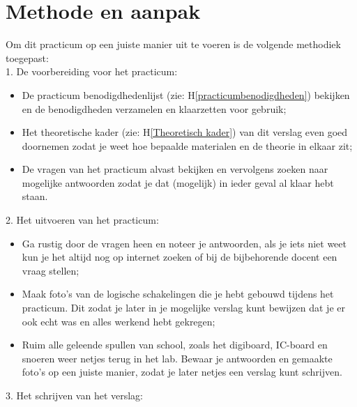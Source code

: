 \documentclass[12pt]{article}
\begin{document}
\section{Methode en aanpak}
Om dit practicum op een juiste manier uit te voeren is de volgende methodiek toegepast:\\
1. De voorbereiding voor het practicum:
\begin{itemize}
  \item De practicum benodigdhedenlijst (zie: H\ref{practicumbenodigdheden}) bekijken en de benodigdheden verzamelen en klaarzetten voor gebruik;
  \item Het theoretische kader (zie: H\ref{Theoretisch kader}) van dit verslag even goed doornemen zodat je weet hoe bepaalde materialen en de theorie in elkaar zit;
  \item De vragen van het practicum alvast bekijken en vervolgens zoeken naar mogelijke antwoorden zodat je dat (mogelijk) in ieder geval al klaar hebt staan. 
\end{itemize}
2. Het uitvoeren van het practicum:
\begin{itemize}
    \item Ga rustig door de vragen heen en noteer je antwoorden, als je iets niet weet kun je het altijd nog op internet zoeken of bij de bijbehorende docent een vraag stellen;
    \item Maak foto's van de logische schakelingen die je hebt gebouwd tijdens het practicum. Dit zodat je later in je mogelijke verslag kunt bewijzen dat je er ook echt was en alles werkend hebt gekregen;
    \item Ruim alle geleende spullen van school, zoals het digiboard, IC-board en snoeren weer netjes terug in het lab. Bewaar je antwoorden en gemaakte foto's op een juiste manier, zodat je later netjes een verslag kunt schrijven. 
\end{itemize}
3. Het schrijven van het verslag:
\end{document}
